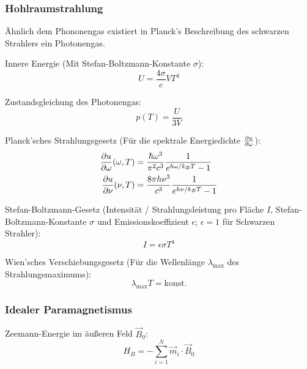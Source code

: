 \documentclass[11pt]{article}
\numberwithin{equation}{section}
\begin{document}
			\subsubsection{Hohlraumstrahlung}
				\noindent
				Ähnlich dem Phononengas existiert in Planck's Beschreibung des schwarzen Strahlers ein Photonengas. \vsp

				\noindent
				Innere Energie (Mit Stefan-Boltzmann-Konstante $\sigma$):
				\begin{equation}
					U = \frac{4\sigma}{c} V T^4
				\end{equation}

				\noindent
				Zustandsgleichung des Photonengas:
				\begin{equation}
					p(T) = \frac{U}{3V}
				\end{equation}

				\noindent
				Planck'sches Strahlungsgesetz (Für die spektrale Energiedichte $\frac{\partial u}{\partial \omega}$):
				\begin{equation}
						\begin{aligned}
								\frac{\partial u}{\partial \omega}(\omega,T) &= \frac{\hbar \omega^3}{\pi^2 c^3} \frac{1}{e^{\hbar \omega / k_B T} - 1} \\
								\frac{\partial u}{\partial \nu} (\nu, T) &= \frac{8 \pi h \nu^3}{c^3} \frac{1}{e^{h \nu / k_B T} - 1} \\
						\end{aligned}
				\end{equation}

				\noindent
				Stefan-Boltzmann-Gesetz (Intensität / Strahlungsleistung pro Fläche $I$, Stefan-Boltzmann-Konstante $\sigma$ und Emissionskoeffizient $\epsilon$; $\epsilon=1$ für Schwarzen Strahler):
				\begin{equation}
					I = \epsilon\sigma T^4
				\end{equation}

				\noindent
				Wien'sches Verschiebungsgesetz (Für die Wellenlänge $\lambda_{\max}$ des Strahlungsmaximums):
				\begin{equation}
					\lambda_{\max} T = \mathrm{konst}.
				\end{equation}

				\subsubsection{Idealer Paramagnetismus}
				\noindent
				Zeemann-Energie im äußeren Feld $\vec{B}_0$:
				\begin{equation}
					H_B = -\sum_{i=1}^N \vec{m}_i \cdot \vec{B}_0
				\end{equation}
\end{document}
